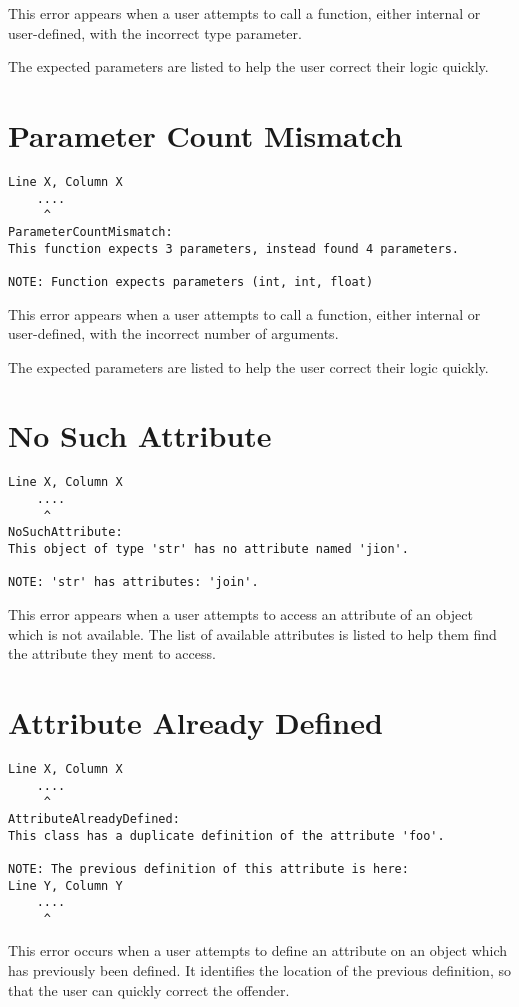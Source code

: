 This error appears when a user attempts to call a function, either internal or user-defined,
with the incorrect type parameter.

The expected parameters are listed to help the user correct their logic quickly.

\section{Parameter Count Mismatch}
\begin{lstlisting}[breaklines]
Line X, Column X
    ....
     ^
ParameterCountMismatch:
This function expects 3 parameters, instead found 4 parameters.

NOTE: Function expects parameters (int, int, float)
\end{lstlisting}

This error appears when a user attempts to call a function, either internal or user-defined,
with the incorrect number of arguments.

The expected parameters are listed to help the user correct their logic quickly.

\section{No Such Attribute}
\begin{lstlisting}[breaklines]
Line X, Column X
    ....
     ^
NoSuchAttribute:
This object of type 'str' has no attribute named 'jion'.

NOTE: 'str' has attributes: 'join'.
\end{lstlisting}

This error appears when a user attempts to access an attribute of an object
which is not available. The list of available attributes is listed to help them
find the attribute they ment to access.

\section{Attribute Already Defined}
\begin{lstlisting}[breaklines]
Line X, Column X
    ....
     ^
AttributeAlreadyDefined:
This class has a duplicate definition of the attribute 'foo'.

NOTE: The previous definition of this attribute is here:
Line Y, Column Y
    ....
     ^
\end{lstlisting}

This error occurs when a user attempts to define an attribute on an object which
has previously been defined. It identifies the location of the previous
definition, so that the user can quickly correct the offender.


